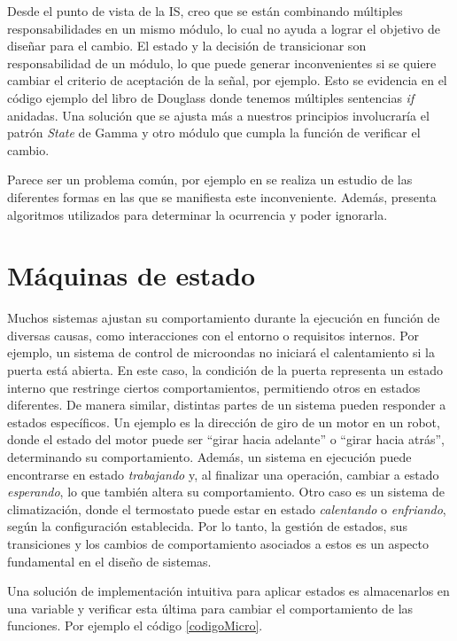 Desde el punto de vista de la IS, creo que se están combinando múltiples responsabilidades en un mismo módulo, lo cual no ayuda a lograr el objetivo de diseñar para el cambio. El estado y la decisión de transicionar son responsabilidad de un módulo, lo que puede generar inconvenientes si se quiere cambiar el criterio de aceptación de la señal, por ejemplo. Esto se evidencia en el código ejemplo del libro de Douglass donde tenemos múltiples sentencias \textit{if} anidadas. Una solución que se ajusta más a nuestros principios involucraría el patrón \textit{State} de Gamma y otro módulo que cumpla la función de verificar el cambio.

Parece ser un problema común, por ejemplo en \cite{ganssleDebouncing} se realiza un estudio de las diferentes formas en las que se manifiesta este inconveniente. Además, presenta algoritmos utilizados para determinar la ocurrencia y poder ignorarla.

\section{Máquinas de estado}\label{cap:state}


Muchos sistemas ajustan su comportamiento durante la ejecución en función de diversas causas, como interacciones con el entorno o requisitos internos. Por ejemplo, un sistema de control de microondas no iniciará el calentamiento si la puerta está abierta. En este caso, la condición de la puerta representa un estado interno que restringe ciertos comportamientos, permitiendo otros en estados diferentes. De manera similar, distintas partes de un sistema pueden responder a estados específicos. Un ejemplo es la dirección de giro de un motor en un robot, donde el estado del motor puede ser ``girar hacia adelante'' o ``girar hacia atrás'', determinando su comportamiento. Además, un sistema en ejecución puede encontrarse en estado \textit{trabajando} y, al finalizar una operación, cambiar a estado \textit{esperando}, lo que también altera su comportamiento. Otro caso es un sistema de climatización, donde el termostato puede estar en estado \textit{calentando} o \textit{enfriando}, según la configuración establecida. Por lo tanto, la gestión de estados, sus transiciones y los cambios de comportamiento asociados a estos es un aspecto fundamental en el diseño de sistemas.

Una solución de implementación intuitiva para aplicar estados es almacenarlos en una variable y verificar esta última para cambiar el comportamiento de las funciones. Por ejemplo el código \ref{codigoMicro}.

